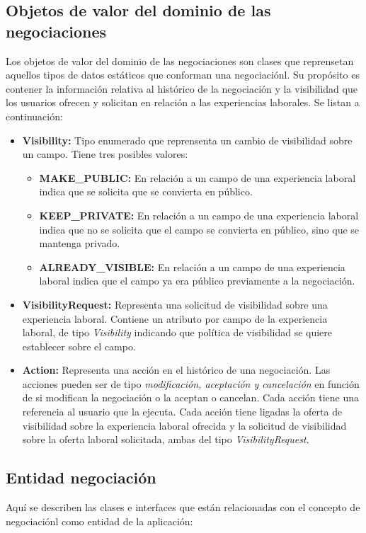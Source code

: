 \documentclass[a4paper, 12pt]{book}
\begin{document}
\subsection{Objetos de valor del dominio de las negociaciones}
\label{subsec:negotiation_value_objects}
Los objetos de valor del dominio de las negociaciones son clases que reprensetan aquellos tipos de datos estáticos que conforman una negociaciónl.
Su propósito es contener la información relativa al histórico de la negociación y la visibilidad que los usuarios ofrecen y solicitan en relación a las experiencias laborales.
Se listan a continuación:

	\begin{itemize}
	\item \textbf{Visibility:} Tipo enumerado que reprensenta un cambio de visibilidad sobre un campo. Tiene tres posibles valores:
		\begin{itemize}
		\item \textbf{MAKE\_PUBLIC:} En relación a un campo de una experiencia laboral indica que se solicita que se convierta en público.
		\item \textbf{KEEP\_PRIVATE:} En relación a un campo de una experiencia laboral indica que no se solicita que el campo se convierta en público, sino que se mantenga privado.
		\item \textbf{ALREADY\_VISIBLE:} En relación a un campo de una experiencia laboral indica que el campo ya era público previamente a la negociación.
		\end{itemize}
	\item \textbf{VisibilityRequest:} Representa una solicitud de visibilidad sobre una experiencia laboral. Contiene un atributo por campo de la experiencia laboral, de tipo \emph{Visibility} indicando que política de visibilidad se quiere establecer sobre el campo.
	\item \textbf{Action:} Representa una acción en el histórico de una negociación. Las acciones pueden ser de tipo \emph{modificación, aceptación y cancelación} en función de si modifican la negociación o la aceptan o cancelan.
	Cada acción tiene una referencia al usuario que la ejecuta.
	Cada acción tiene ligadas la oferta de visibilidad sobre la experiencia laboral ofrecida y la solicitud de visibilidad sobre la oferta laboral solicitada, ambas del tipo \emph{VisibilityRequest}.
	\end{itemize}


\subsection{Entidad negociación}
\label{subsec:negotiation_entity}
Aquí se describen las clases e interfaces que están relacionadas con el concepto de negociaciónl como entidad de la aplicación:
\end{document}
